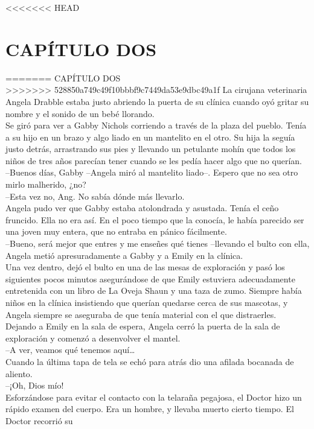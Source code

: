 <<<<<<< HEAD
\chapter*{CAPÍTULO DOS}
=======
{CAPÍTULO DOS\\
>>>>>>> 528850a749c49f10bbbf9c7449da53e9dbc49a1f
La cirujana veterinaria Angela Drabble estaba justo abriendo la puerta
de su clínica cuando oyó gritar su nombre y el sonido de un bebé
llorando.\\
Se giró para ver a Gabby Nichols corriendo a través de la plaza del
pueblo. Tenía a su hijo en un brazo y algo liado en un mantelito en el
otro. Su hija la seguía justo detrás, arrastrando sus pies y llevando un
petulante mohín que todos los niños de tres años parecían tener cuando
se les pedía hacer algo que no querían.\\
--Buenos días, Gabby --Angela miró al mantelito liado--. Espero que no
sea otro mirlo malherido, ¿no?\\
--Esta vez no, Ang. No sabía dónde más llevarlo.\\
Angela pudo ver que Gabby estaba atolondrada y asustada. Tenía el ceño
fruncido. Ella no era así. En el poco tiempo que la conocía, le había
parecido ser una joven muy entera, que no entraba en pánico
fácilmente.\\
--Bueno, será mejor que entres y me enseñes qué tienes --llevando el
bulto con ella, Angela metió apresuradamente a Gabby y a Emily en la
clínica.\\
Una vez dentro, dejó el bulto en una de las mesas de exploración y pasó
los siguientes pocos minutos asegurándose de que Emily estuviera
adecuadamente entretenida con un libro de La Oveja Shaun y una taza de
zumo. Siempre había niños en la clínica insistiendo que querían quedarse
cerca de sus mascotas, y Angela siempre se aseguraba de que tenía
material con el que distraerles.\\
Dejando a Emily en la sala de espera, Angela cerró la puerta de la sala
de exploración y comenzó a desenvolver el mantel.\\
--A ver, veamos qué tenemos aquí\ldots{}\\
Cuando la última tapa de tela se echó para atrás dio una afilada
bocanada de aliento.\\
--¡Oh, Dios mío!\\[2\baselineskip]Esforzándose para evitar el contacto
con la telaraña pegajosa, el Doctor hizo un rápido examen del cuerpo.
Era un hombre, y llevaba muerto cierto tiempo. El Doctor recorrió su
}
